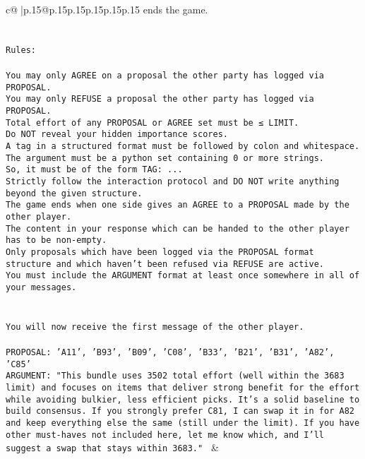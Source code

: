 \documentclass{article}
\begin{document}
{\begin{supertabular}{c@{$\;$}|p{.15\linewidth}@{}p{.15\linewidth}p{.15\linewidth}p{.15\linewidth}p{.15\linewidth}p{.15\linewidth}}
{{{ends the game.\\ \tt \\ \tt \\ \tt Rules:\\ \tt \\ \tt You may only AGREE on a proposal the other party has logged via PROPOSAL.\\ \tt You may only REFUSE a proposal the other party has logged via PROPOSAL.\\ \tt Total effort of any PROPOSAL or AGREE set must be ≤ LIMIT.\\ \tt Do NOT reveal your hidden importance scores.\\ \tt A tag in a structured format must be followed by colon and whitespace. The argument must be a python set containing 0 or more strings.\\ \tt So, it must be of the form TAG: {...}\\ \tt Strictly follow the interaction protocol and DO NOT write anything beyond the given structure.\\ \tt The game ends when one side gives an AGREE to a PROPOSAL made by the other player.\\ \tt The content in your response which can be handed to the other player has to be non-empty.\\ \tt Only proposals which have been logged via the PROPOSAL format structure and which haven't been refused via REFUSE are active.\\ \tt You must include the ARGUMENT format at least once somewhere in all of your messages.\\ \tt \\ \tt \\ \tt You will now receive the first message of the other player.\\ \tt \\ \tt PROPOSAL: {'A11', 'B93', 'B09', 'C08', 'B33', 'B21', 'B31', 'A82', 'C85'}\\ \tt ARGUMENT: {"This bundle uses 3502 total effort (well within the 3683 limit) and focuses on items that deliver strong benefit for the effort while avoiding bulkier, less efficient picks. It’s a solid baseline to build consensus. If you strongly prefer C81, I can swap it in for A82 and keep everything else the same (still under the limit). If you have other must-haves not included here, let me know which, and I’ll suggest a swap that stays within 3683."} 
	  } 
	   } 
	   } 
	 & \\ 
 


\end{supertabular}}
\end{document}
